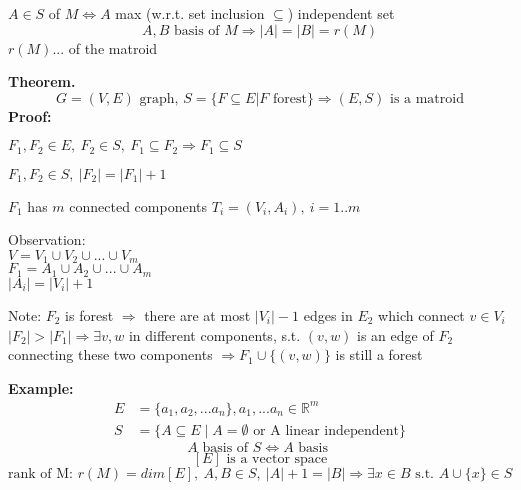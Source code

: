 \begin{definition}
	$A\in S$  of $M \Leftrightarrow A$ max (w.r.t. set inclusion $\subseteq$) independent set
	\[
	A, B \text{ basis of } M \Rightarrow |A| = |B| = r(M)
	\]
	$r(M)$...  of the matroid
\end{definition}

\textbf{Theorem.}
\[G=(V,E) \text{ graph, }S=\{F\subseteq E | F \text{ forest}\} \Rightarrow (E,S) \text{ is a matroid}\]
\textbf{Proof:}
\begin{compactenum}[(1)]
	\item{$F_1, F_2 \in E,~F_2\in S,~F_1\subseteq F_2\Rightarrow F_1\subseteq S$}
	\item{$F_1, F_2\in S, ~|F_2| = |F_1| + 1$}
	\item{$F_1$} has $m$ connected components $T_i=(V_i, A_i),~i=1..m$
	\item{Observation: \\
	$V=V_1\cup V_2\cup ... \cup V_m$\\
	$F_1 = A_1\cup A_2\cup ... \cup A_m$\\
	$|A_i|=|V_i|+1$}
	\item{}
	\item{Note: $F_2$ is forest $\Rightarrow$ there are at most $|V_i|-1$ edges in $E_2$ which connect $v\in V_i$ $|F_2| > |F_1| \Rightarrow \exists v,w $ in different components, s.t. $(v,w)$ is an edge of $F_2$ connecting these two components $\Rightarrow F_1\cup\{(v,w)\}$ is still a forest}
\end{compactenum}


\textbf{Example:}
\begin{align*}
  E &= \{a_1, a_2, ... a_n\}, a_1, ... a_n \in \mathbb{R}^m\\
  S &= \{A\subseteq E ∣ A=\emptyset \text{ or A linear independent}\}
\end{align*}
\[A \text{ basis of } S \Leftrightarrow A \text{ basis }
\]
\[
	[E] \text{ is a vector space}
\]
\[
	\text{rank of M: } r(M) = dim[E],~A,B\in S,~|A|+1=|B|\Rightarrow \exists x\in B \text{ s.t. } A\cup \{x\}\in S
\]

